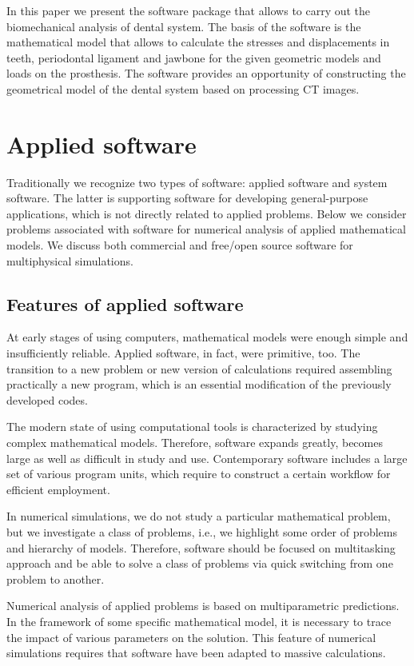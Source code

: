 \documentclass{elsarticle}
\begin{document}
In this paper we present the software package that allows to carry out
the biomechanical analysis of dental system. The basis of the software
is the mathematical model that allows to calculate the stresses and
displacements in teeth, periodontal ligament and jawbone for the given geometric
models and loads on the prosthesis. The software provides an
opportunity of constructing the geometrical model of the dental system
based on processing CT images.


\section{Applied software}

Traditionally we recognize two types of software: applied software and system software.
The latter is supporting software for developing general-purpose applications, 
which is not directly related to applied problems.
Below we consider problems associated with software for numerical analysis of applied mathematical models.
We discuss both commercial and free/open source software for multiphysical simulations.

\subsection{Features of applied software} 

At early stages of using computers, mathematical models were enough simple and insufficiently reliable. 
Applied software, in fact, were primitive, too.
The transition to a new problem or new version of calculations required assembling practically a new program,
which is an essential modification of the previously developed codes.

The modern state of using computational tools is characterized by
studying complex mathematical models.  Therefore, software expands
greatly, becomes large as well as difficult in study and use.
Contemporary software includes a large set of various program units,
which require to construct a certain workflow for efficient
employment.

In numerical simulations, we do not study a particular mathematical problem, but we investigate a class of problems, i.e., 
we highlight some order of problems and hierarchy of models.
Therefore, software should be focused on multitasking approach and be able to solve a class of problems via quick
switching from one problem to another. 

Numerical analysis of applied problems is based on multiparametric predictions.
In the framework of some specific mathematical model, it is necessary to trace the impact of various parameters 
on the solution.
This feature of numerical simulations requires that software have been adapted to massive calculations.
\end{document}
